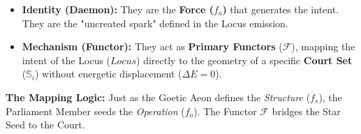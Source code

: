 \documentclass[11pt, letterpaper]{article}
\newcommand{\LoI}{\ensuremath{\mathop{\textnormal{\symbolafont\symbol{"26CE}}}}}
\def\LoI{Locus}%
\begin{document}
\begin{itemize}
    \item \textbf{Identity (Daemon):} They are the \textbf{Force ($f_o$)} that generates the intent. They are the "uncreated spark" defined in the Locus emission.
    \item \textbf{Mechanism (Functor):} They act as \textbf{Primary Functors} ($\mathcal{F}$), mapping the intent of the Locus ($\LoI$) directly to the geometry of a specific \textbf{Court Set} ($\mathbb{S}_{i}$) without energetic displacement ($\Delta E = 0$).
\end{itemize}

\textbf{The Mapping Logic:}
Just as the Goetic Aeon defines the \textit{Structure} ($f_s$), the Parliament Member seeds the \textit{Operation} ($f_o$). The Functor $\mathcal{F}$ bridges the Star Seed to the Court.
\end{document}
